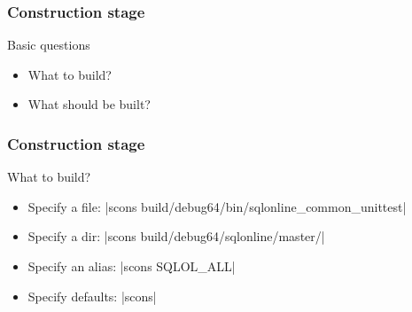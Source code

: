 \documentclass[lualatex]{beamer}
\begin{document}
\begin{frame}
  \frametitle{Construction stage}

  \begin{block}{Basic questions}
    \begin{itemize}
    \item What to build?
    \item What should be built?
    \end{itemize}
  \end{block}
\end{frame}

\begin{frame}[fragile]
  \frametitle{Construction stage}

  \begin{block}{What to build?}
    \begin{itemize}
    \item Specify a file: |scons build/debug64/bin/sqlonline_common_unittest|
    \item Specify a dir: |scons build/debug64/sqlonline/master/|
    \item Specify an alias: |scons SQLOL_ALL|
    \item Specify defaults: |scons|
    \end{itemize}
  \end{block}
\end{frame}
\end{document}
